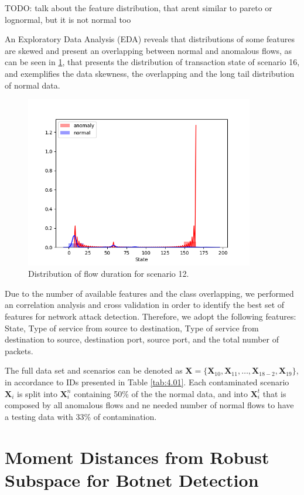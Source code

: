 TODO: talk about the feature distribution, that arent similar to pareto or lognormal, but it is not normal too

An Exploratory Data Analysis (EDA) reveals that distributions of some features are skewed and present an overlapping between normal and anomalous flows, as can be seen in  \ref{fig:4.01}, that presents the distribution of transaction state of scenario 16, and exemplifies the data skewness, the overlapping and the long tail distribution of normal data. 
\begin{figure}[h!]
     \centering
     \includegraphics[width=10cm]{figures/raw_distplot_capture20110816_State.png}
     \caption{Distribution of flow duration for scenario 12.}
     \label{fig:4.01}
\end{figure}

Due to the number of available features and the class overlapping, we performed an correlation analysis and cross validation in order to identify the best set of features for network attack detection. Therefore, we adopt the following features: State, Type of service from source to destination, Type of service from destination to source, destination port, source port, and the total number of packets.

The full data set and scenarios can be denoted as $\boldsymbol{X} = \{\boldsymbol{X}_{10}, \boldsymbol{X}_{11}, \ldots , \boldsymbol{X}_{18-2}, \boldsymbol{X}_{19}\}$, in accordance to IDs presented in Table \ref{tab:4.01}. Each contaminated scenario $\boldsymbol{X}_i$ is split into $\boldsymbol{X}_i^n$ containing 50\% of the the normal data, and into $\boldsymbol{X}_i^t$ that is composed by all anomalous flows and ne needed number of normal flows to have a testing data with 33\% of contamination.

\section{Moment Distances from Robust Subspace for Botnet Detection}
\label{sec:4_proposal}

